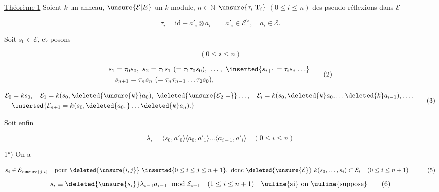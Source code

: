 
\uline{Théorème 1} Soient $k$ un anneau, $\unsure{\mathcal E|E}$ un $k$-module, $n\in\mathbb N$  $\unsure{\tau_i|\mathrm T_i}$ $(0\leq i\leq n)$ des pseudo réflexions dans $\mathcal E$

\[\tau_i=\mathrm{id}+a'_i\otimes a_i\qquad a'_i\in\mathcal E^\vee,\quad a_i\in\mathcal E.\tag*{(1)}\]

Soit $s_0\in\mathcal E$, et posons 

\[(0\leq i\leq n)\]

\[\begin{aligned}s_1&=\tau_0s_0,\ s_2=\tau_1s_1\ (= \tau_1\tau_0s_0),\ \ldots,\ \inserted{s_{i+1}=\tau_i s_i\,\ldots}\\
&s_{n+1}=\tau_n s_n\ (= \tau_n\tau_{n-1}\ldots\tau_0s_0),\end{aligned}\tag*{(2)}\]

\[\begin{aligned}\mathcal E_0&=ks_0,\quad\mathcal E_1=k(s_0,\deleted{\unsure{k}}a_0),\ \deleted{\unsure{\mathcal E_2=}}\ldots,\quad\mathcal E_i=k(s_0,\deleted{k}a_0,\ldots\deleted{k}a_{i-1}),\ldots.\\
&\inserted{\mathcal E_{n+1}=k(s_0,\deleted{a_0,}\ldots\deleted{k}a_n).}\end{aligned}\tag*{(3)}\]

Soit enfin

\[\lambda_i=\langle s_0,a'_0\rangle\langle a_0,a'_1\rangle\ldots\langle a_{i-1},a'_i\rangle\quad(0\leq i\leq n)\tag*{(4)}\]



1°) On a

\[\begin{aligned}s_i&\in\mathcal E_{\unsure{j|i}}\quad\text{pour }\deleted{\unsure{i,j}}\ \inserted{0\leq i\leq j\leq n+1},\ \text{donc }\deleted{\unsure{\mathcal E}}\ k(s_0,\ldots,s_i)\subset\mathcal E_i\quad(0\leq i\leq n+1)\end{aligned}\tag*{(5)}\]
\[s_i\equiv\deleted{\unsure{s_i}}\lambda_{i-1}a_{i-1}\mod\mathcal E_{i-1}\quad(1\leq i\leq n+1)\quad\text{\uuline{si} on \uuline{suppose}}\tag*{(6)}\]

